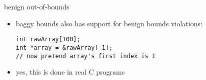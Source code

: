 
\begin{frame}[fragile,label=bbNit]{benign out-of-bounds}
\lstset{language=C,style=small}
    \begin{itemize}
        \item baggy bounds also has support for benign bounds violations:
\begin{lstlisting}
int rawArray[100];
int *array = &rawArray[-1];
// now pretend array's first index is 1
\end{lstlisting}
        \item yes, this is done in real C programs
    \end{itemize}
\end{frame}
